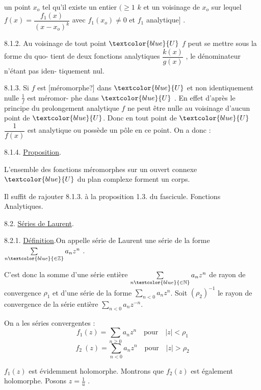 \documentclass[11pt]{article}
\newcommand{\scanpage}[1]{\par\bigskip\noindent{\small\sffamily[scan #1]}\par}
\newcommand{\mspage}[1]{{\small\sffamily[p.\,#1]}}
\newcommand{\hand}[1]{\textcolor{blue}{#1}}
\newcommand{\uline}[1]{\underline{#1}}
\newcommand{\unsure}[1]{[#1?]}
\begin{document}
\mspage{\hand{185}}

\clearpage
\scanpage{119/186}
\mspage{- 5 -}

un point $x_o$ tel qu'il existe un entier $( \geq 1$ $k$ et un voisinage de $x_o$ sur
lequel $f(x) = \dfrac{f_1(x)}{(x-x_o)^k}$ avec $f_1(x_o) \neq 0$ et $f_1$ analytique$]$ .

8.1.2. Au voisinage de tout point $\hand{U}$ $f$ peut se mettre sous la forme du quo-%
tient de deux fonctions analytiques $\dfrac{k(x)}{g(x)}$ , le dénominateur n'étant pas iden-%
tiquement nul.

8.1.3. Si $f$ est \unsure{méromorphe} dans $\hand{U}$ et non identiquement nulle $\frac{1}{f}$ est méromor-%
phe dans $\hand{U}$ . En effet d'après le principe du prolongement analytique $f$ ne
peut être nulle au voisinage d'aucun point de $\hand{U}$. Donc en tout point de $\hand{U}$ $\dfrac{1}{f(x)}$
est analytique ou possède un pôle en ce point. On a donc :

8.1.4. \uline{Proposition}.

L'ensemble des fonctions méromorphes sur un ouvert connexe $\hand{U}$ du
plan complexe forment un corps.

Il suffit de rajouter 8.1.3. à la proposition 1.3. du fascicule.
Fonctions Analytiques.

8.2. \uline{Séries de Laurent}.

8.2.1. \uline{Définition}.On appelle série de Laurent une série de la forme $\sum\limits_{n \hand{\in \mathbb{Z}}} a_n z^n$ .

C'est donc la somme d'une série entière $\sum\limits_{n \hand{\in \mathbb{N}}} a_n z^n$ de rayon de convergence $\rho_1$
et d'une série de la forme $\sum\limits_{n<0} a_n z^n$. Soit $(\rho_2)^{-1}$ le rayon de convergence de
la série entière $\sum\limits_{n<0} a_n z^{-n}$.

On a les séries convergentes :
\[ f_1(z) = \sum_{n \geq 0} a_n z^n \quad \text{pour} \quad |z| < \rho_1 \]
\[ f_2\ (z) = \sum_{n < 0} a_n z^n \quad \text{pour} \quad |z| > \rho_2 \]

$f_1(z)$ est évidemment holomorphe. Montrons que $f_2(z)$ est également
holomorphe. Posons $z = \frac{1}{u}$ .
\end{document}

